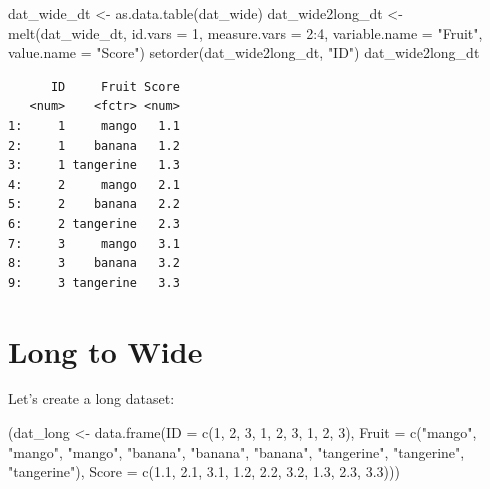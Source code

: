 \documentclass[
]{book}
\newenvironment{Shaded}{\begin{snugshade}}{\end{snugshade}}
\newcommand{\AttributeTok}[1]{\textcolor[rgb]{0.77,0.63,0.00}{#1}}
\newcommand{\DecValTok}[1]{\textcolor[rgb]{0.00,0.00,0.81}{#1}}
\newcommand{\FloatTok}[1]{\textcolor[rgb]{0.00,0.00,0.81}{#1}}
\newcommand{\FunctionTok}[1]{\textcolor[rgb]{0.00,0.00,0.00}{#1}}
\newcommand{\NormalTok}[1]{#1}
\newcommand{\OtherTok}[1]{\textcolor[rgb]{0.56,0.35,0.01}{#1}}
\newcommand{\SpecialCharTok}[1]{\textcolor[rgb]{0.00,0.00,0.00}{#1}}
\newcommand{\StringTok}[1]{\textcolor[rgb]{0.31,0.60,0.02}{#1}}
\begin{document}
\begin{Shaded}
\begin{Highlighting}[]
\NormalTok{dat\_wide\_dt }\OtherTok{\textless{}{-}} \FunctionTok{as.data.table}\NormalTok{(dat\_wide)}
\NormalTok{dat\_wide2long\_dt }\OtherTok{\textless{}{-}} \FunctionTok{melt}\NormalTok{(dat\_wide\_dt,}
                         \AttributeTok{id.vars =} \DecValTok{1}\NormalTok{,}
                         \AttributeTok{measure.vars =} \DecValTok{2}\SpecialCharTok{:}\DecValTok{4}\NormalTok{,}
                         \AttributeTok{variable.name =} \StringTok{"Fruit"}\NormalTok{,}
                         \AttributeTok{value.name =} \StringTok{"Score"}\NormalTok{)}
\FunctionTok{setorder}\NormalTok{(dat\_wide2long\_dt, }\StringTok{"ID"}\NormalTok{)}
\NormalTok{dat\_wide2long\_dt}
\end{Highlighting}
\end{Shaded}

\begin{verbatim}
      ID     Fruit Score
   <num>    <fctr> <num>
1:     1     mango   1.1
2:     1    banana   1.2
3:     1 tangerine   1.3
4:     2     mango   2.1
5:     2    banana   2.2
6:     2 tangerine   2.3
7:     3     mango   3.1
8:     3    banana   3.2
9:     3 tangerine   3.3
\end{verbatim}

\hypertarget{long-to-wide}{%
\section{Long to Wide}\label{long-to-wide}}

Let's create a long dataset:

\begin{Shaded}
\begin{Highlighting}[]
\NormalTok{(dat\_long }\OtherTok{\textless{}{-}} \FunctionTok{data.frame}\NormalTok{(}\AttributeTok{ID =} \FunctionTok{c}\NormalTok{(}\DecValTok{1}\NormalTok{, }\DecValTok{2}\NormalTok{, }\DecValTok{3}\NormalTok{, }\DecValTok{1}\NormalTok{, }\DecValTok{2}\NormalTok{, }\DecValTok{3}\NormalTok{, }\DecValTok{1}\NormalTok{, }\DecValTok{2}\NormalTok{, }\DecValTok{3}\NormalTok{),}
                       \AttributeTok{Fruit =} \FunctionTok{c}\NormalTok{(}\StringTok{"mango"}\NormalTok{, }\StringTok{"mango"}\NormalTok{, }\StringTok{"mango"}\NormalTok{, }
                                 \StringTok{"banana"}\NormalTok{, }\StringTok{"banana"}\NormalTok{, }\StringTok{"banana"}\NormalTok{, }
                                 \StringTok{"tangerine"}\NormalTok{, }\StringTok{"tangerine"}\NormalTok{, }\StringTok{"tangerine"}\NormalTok{),}
                       \AttributeTok{Score =} \FunctionTok{c}\NormalTok{(}\FloatTok{1.1}\NormalTok{, }\FloatTok{2.1}\NormalTok{, }\FloatTok{3.1}\NormalTok{, }\FloatTok{1.2}\NormalTok{, }\FloatTok{2.2}\NormalTok{, }\FloatTok{3.2}\NormalTok{, }\FloatTok{1.3}\NormalTok{, }\FloatTok{2.3}\NormalTok{, }\FloatTok{3.3}\NormalTok{)))}
\end{Highlighting}
\end{Shaded}
\end{document}
